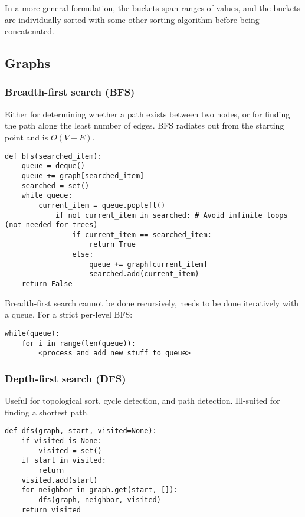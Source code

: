 \documentclass[8pt, table, xcdraw]{article}%
\begin{document}
In a more general formulation, the buckets span ranges of values, and the buckets are individually sorted with some other sorting algorithm before being concatenated.

\subsection{Graphs}

\subsubsection{Breadth-first search (BFS)}

Either for determining whether a path exists between two nodes, or for finding the path along the least number of edges. BFS radiates out from the starting point and is $O(V+E)$.

\begin{lstlisting}
def bfs(searched_item):
    queue = deque()
    queue += graph[searched_item]
    searched = set()
    while queue:
        current_item = queue.popleft()
            if not current_item in searched: # Avoid infinite loops (not needed for trees)
                if current_item == searched_item:
                    return True
                else:
                    queue += graph[current_item]
                    searched.add(current_item)
    return False
\end{lstlisting}

Breadth-first search cannot be done recursively, needs to be done iteratively with a queue. For a strict per-level BFS:

\begin{lstlisting}
while(queue):
	for i in range(len(queue)):
		<process and add new stuff to queue>
\end{lstlisting}

\subsubsection{Depth-first search (DFS)}

Useful for topological sort, cycle detection, and path detection. Ill-suited for finding a shortest path.

\begin{lstlisting}
def dfs(graph, start, visited=None):
    if visited is None:
        visited = set()
    if start in visited:
        return
    visited.add(start)
    for neighbor in graph.get(start, []):
        dfs(graph, neighbor, visited)
    return visited
\end{lstlisting}
\end{document}
